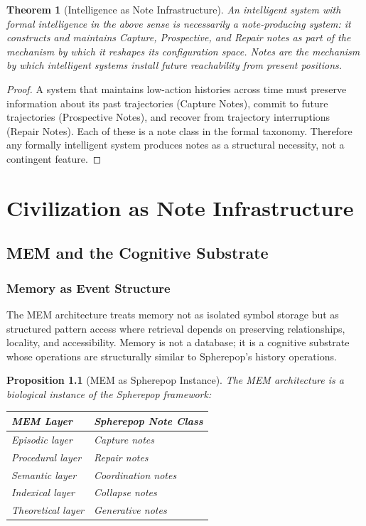 \documentclass[12pt, a4paper, openany]{book}
\theoremstyle{plain}
\newtheorem{theorem}{Theorem}[chapter]
\newtheorem{proposition}[theorem]{Proposition}
\theoremstyle{definition}
\theoremstyle{remark}
\begin{document}
\begin{theorem}[Intelligence as Note Infrastructure]
An intelligent system with formal intelligence in the above sense is necessarily
a note-producing system: it constructs and maintains Capture, Prospective, and
Repair notes as part of the mechanism by which it reshapes its configuration space.
Notes are the mechanism by which intelligent systems install future reachability
from present positions.
\end{theorem}

\begin{proof}
A system that maintains low-action histories across time must preserve information
about its past trajectories (Capture Notes), commit to future trajectories
(Prospective Notes), and recover from trajectory interruptions (Repair Notes).
Each of these is a note class in the formal taxonomy. Therefore any formally
intelligent system produces notes as a structural necessity, not a contingent
feature.
\end{proof}

\part{Civilization as Note Infrastructure}

\chapter{MEM and the Cognitive Substrate}

\section{Memory as Event Structure}

The MEM architecture treats memory not as isolated symbol storage but as
structured pattern access where retrieval depends on preserving relationships,
locality, and accessibility. Memory is not a database; it is a cognitive substrate
whose operations are structurally similar to Spherepop's history operations.

\begin{proposition}[MEM as Spherepop Instance]
The MEM architecture is a biological instance of the Spherepop framework:
\begin{center}
\begin{tabular}{ll}
\toprule
MEM\textbar8 Layer & Spherepop Note Class \\
\midrule
Episodic layer & Capture notes \\
Procedural layer & Repair notes \\
Semantic layer & Coordination notes \\
Indexical layer & Collapse notes \\
Theoretical layer & Generative notes \\
\bottomrule
\end{tabular}
\end{center}
\end{proposition}
\end{document}

